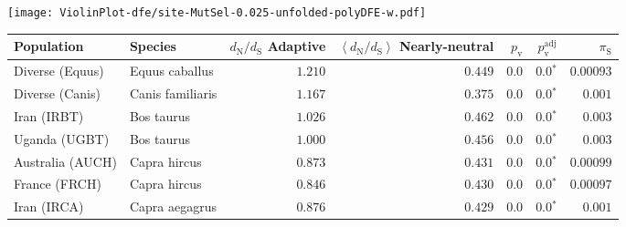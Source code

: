 \begin{center}
\begin{adjustbox}{width = 1\textwidth}
\begin{tabular}{|l|l|r|r|r|r|r|r|r|}
\bottomrule
\end{tabular}
\end{adjustbox}
\newpage
\texttt{[image: ViolinPlot-dfe/site-MutSel-0.025-unfolded-polyDFE-w.pdf]} 
\begin{adjustbox}{width = 1\textwidth}
\begin{tabular}{|l|l|r|r|r|r|r|}
\toprule
                     Population &              Species & \specialcell{$d_{\mathrm{N}} / d_{\mathrm{S}}$ \\ Adaptive} & \specialcell{$\left< d_{\mathrm{N}} / d_{\mathrm{S}} \right>$ \\ Nearly-neutral} & $p_{\mathrm{v}}$ & $p_{\mathrm{v}}^{\mathrm{adj}}$ & $\pi_{\textrm{S}}$ \\
\midrule
                Diverse (Equus) &       Equus caballus &                                           $ 1.210$ &                                           $ 0.449$ &            $0.0$ &                  $\bm{0.0{^*}}$ &          $0.00093$ \\
                Diverse (Canis) &     Canis familiaris &                                           $ 1.167$ &                                           $ 0.375$ &            $0.0$ &                  $\bm{0.0{^*}}$ &           $ 0.001$ \\
                    Iran (IRBT) &           Bos taurus &                                           $ 1.026$ &                                           $ 0.462$ &            $0.0$ &                  $\bm{0.0{^*}}$ &           $ 0.003$ \\
                  Uganda (UGBT) &           Bos taurus &                                           $ 1.000$ &                                           $ 0.456$ &            $0.0$ &                  $\bm{0.0{^*}}$ &           $ 0.003$ \\
               Australia (AUCH) &         Capra hircus &                                           $ 0.873$ &                                           $ 0.431$ &            $0.0$ &                  $\bm{0.0{^*}}$ &          $0.00099$ \\
                  France (FRCH) &         Capra hircus &                                           $ 0.846$ &                                           $ 0.430$ &            $0.0$ &                  $\bm{0.0{^*}}$ &          $0.00097$ \\
                    Iran (IRCA) &       Capra aegagrus &                                           $ 0.876$ &                                           $ 0.429$ &            $0.0$ &                  $\bm{0.0{^*}}$ &           $ 0.001$ \\

\end{tabular}
\end{adjustbox}
\end{center}
